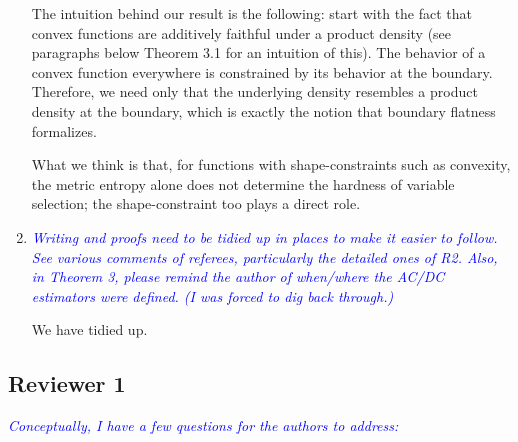 \documentclass[pdftex,12pt]{article}
\def\rc#1{{\it\textcolor{blue}{#1}}\smallskip}
\begin{document}
\begin{enumerate}
The intuition behind our result is the following: start with the fact that convex functions are additively faithful under a product density (see paragraphs below Theorem 3.1 for an intuition of this). The behavior of a convex function everywhere is constrained by its behavior at the boundary. Therefore, we need only that the underlying density resembles a product density at the boundary, which is exactly the notion that boundary flatness formalizes.

What we think is that, for functions with shape-constraints such as convexity, the metric entropy alone does not determine the hardness of variable selection; the shape-constraint too plays a direct role. 

\item \rc{Writing and proofs need to be tidied up in places to make it easier
to follow.  See various comments of referees, particularly the
detailed ones of R2.  Also, in Theorem 3, please remind the author of
when/where the AC/DC estimators were defined.  (I was forced to dig
back through.)}

We have tidied up.

\end{enumerate}

\subsection*{Reviewer 1}

\rc{Conceptually, I have a few questions for the authors to address:}
\end{document}
